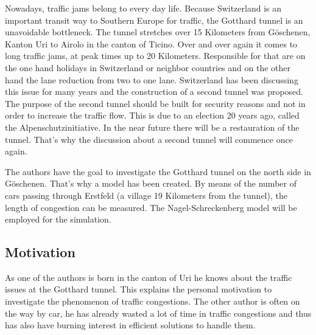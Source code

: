 Nowadays, traffic jams belong to every day life. Because Switzerland is an important transit way to Southern Europe for traffic, the Gotthard tunnel is an unavoidable bottleneck. The tunnel stretches over 15 Kilometers from Göschenen, Kanton Uri to Airolo in the canton of Ticino. Over and over again it comes to long traffic jams, at peak times up to 20 Kilometers. Responsible for that are on the one hand holidays in Switzerland or neighbor countries and on the other hand the lane reduction from two to one lane. Switzerland has been discussing this issue for many years and the construction of a second tunnel was proposed. The purpose of the second tunnel should be built for security reasons and not in order to increase the traffic flow. This is due to an election 20 years ago, called the Alpenschutzinitiative. 
In the near future there will be a restauration of the tunnel. That's why the discussion about a second tunnel will commence once again.

The authors have the goal to investigate the Gotthard tunnel on the north side in Göschenen. That's why a model has been created. By means of the number of cars passing through Erstfeld (a village 19 Kilometers from the tunnel), the length of congestion can be measured. The Nagel-Schreckenberg model will be employed for the simulation.


\subsection{Motivation}
As one of the authors is born in the canton of Uri he knows about the traffic issues at the Gotthard tunnel. This explains the personal motivation to investigate the phenomenon of traffic congestions. The other author is often on the way by car, he has already wasted a lot of time in traffic congestions
and thus has also have burning interest in efficient solutions to handle them.















